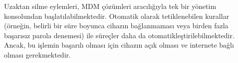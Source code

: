 Uzaktan silme eylemleri, MDM çözümleri aracılığıyla tek bir yönetim konsolundan başlatılabilmektedir. Otomatik olarak tetiklenebilen kurallar (örneğin, belirli bir süre boyunca cihazın bağlanmaması veya birden fazla başarısız parola denemesi) ile süreçler daha da otomatikleştirilebilmektedir. Ancak, bu işlemin başarılı olması için cihazın açık olması ve internete bağlı olması gerekmektedir.


